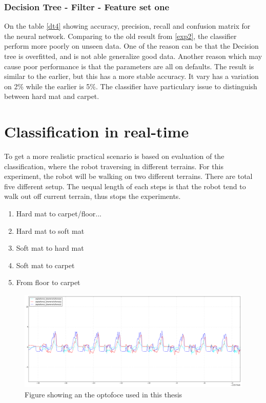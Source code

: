 \documentclass[USenglish]{ifimaster}  %
\begin{document}
\subsubsection{Decision Tree - Filter - Feature set one}
On the table \ref{dt4} showing accuracy, precision, recall and confusion matrix for the neural network. Comparing to the old result from \ref{exp2}, the classifier perform more poorly on unseen data. One of the reason can be that the Decision tree is overfitted, and is not able generalize good data. Another reason which may cause poor performance is that the parameters are all on defaults. The result is similar to the earlier, but this has a more stable accuracy. It vary has a variation on 2\% while the earlier is 5\%. The classifier have particulary issue to distinguish between hard mat and carpet. 


\section{Classification in real-time}
To get a more realistic practical scenario  is based on evaluation of the classification, where the robot traversing in different terrains. For this experiment, the robot will be walking on two different terrains. There are total five different setup. The uequal length of each steps is that the robot tend to walk out off current terrain, thus stops the experiments.

\begin{enumerate}
\item Hard mat to carpet/floor...
\item Hard mat to soft mat
\item Soft mat to hard mat
\item Soft mat to carpet
\item From floor to carpet
\end{enumerate}


\begin{figure}[h]
    \centering
    \includegraphics[width=\textwidth,height=\textheight,keepaspectratio]{Figures/Gulvet4Teppe2}
    \caption{Figure showing an the optofoce used in this thesis \cite{OptoforceFig}}
    \label{fig:optoforce}
\end{figure}
\end{document}
